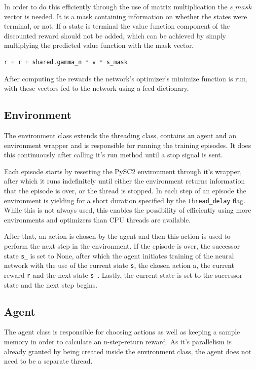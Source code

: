 In order to do this efficiently through the use of matrix multiplication the $s\_mask$ vector is needed. It is a mask containing information on whether the states were terminal, or not. If a state is terminal the value function component of the discounted reward should not be added, which can be achieved by simply multiplying the predicted value function with the mask vector.
\begin{lstlisting}[language=Python]
r = r + shared.gamma_n * v * s_mask
\end{lstlisting}

After computing the rewards the network's optimizer's minimize function is run, with these vectors fed to the network using a feed dictionary.

\subsection{Environment}
The environment class extends the threading class, contains an agent and an environment wrapper and is responsible for running the training episodes. It does this continuously after calling it's run method until a stop signal is sent.

Each episode starts by resetting the PySC2 environment through it's wrapper, after which it runs indefinitely until either the environment returns information that the episode is over, or the thread is stopped. In each step of an episode the environment is yielding for a short duration specified by the \lstinline{thread_delay} flag. While this is not always used, this enables the possibility of efficiently using more environments and optimizers than CPU threads are available.

After that, an action is chosen by the agent and then this action is used to perform the next step in the environment. If the episode is over, the successor state \lstinline{s_} is set to None, after which the agent initiates training of the neural network with the use of the current state \lstinline{s}, the chosen action {a}, the current reward \lstinline{r} and the next state \lstinline{s_}. Lastly, the current state is set to the successor state and the next step begins.

\subsection{Agent}
The agent class is responsible for choosing actions as well as keeping a sample memory in order to calculate an n-step-return reward. As it's parallelism is already granted by being created inside the environment class, the agent does not need to be a separate thread.  


